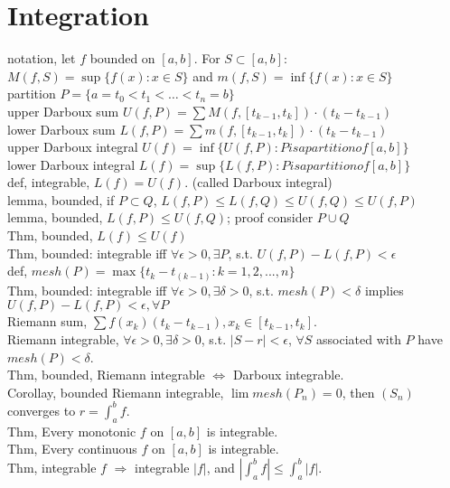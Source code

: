\documentclass[paper=a4, fontsize=11pt]{scrartcl} %
\numberwithin{equation}{section} %
\numberwithin{figure}{section} %
\numberwithin{table}{section} %
\begin{document}
\section{Integration}
notation, let $f$ bounded on $[a,b]$. For $S\subset [a,b]$:\\
$M(f,S)=\sup\{f(x):x\in S\}$ and $m(f,S) = \inf\{f(x):x\in S\}$\\
partition $P = \{a=t_0<t_1<\dots<t_n =b\}$\\
upper Darboux sum $U(f,P) = \sum M(f, [t_{k-1},t_k])\cdot (t_k-t_{k-1})$\\
lower Darboux sum $L(f,P) = \sum m(f, [t_{k-1},t_k])\cdot (t_k-t_{k-1})$\\
upper Darboux integral $U(f) = \inf \{U(f,P): P is a partition of [a,b]\}$\\
lower Darboux integral $L(f) = \sup \{L(f,P): P is a partition of [a,b]\}$\\
def, integrable, $L(f)=U(f)$. (called Darboux integral)\\
lemma, bounded, if $P\subset Q$, $L(f,P)\leq L(f,Q)\leq U(f,Q)\leq U(f,P)$\\
lemma, bounded, $L(f,P)\leq U(f,Q)$; proof consider $P\cup Q$\\
Thm, bounded, $L(f)\leq U(f)$\\
Thm, bounded: integrable iff $\forall\epsilon>0, \exists P$, s.t. $U(f,P) - L(f,P)<\epsilon$\\
def, $mesh(P) = \max\{t_k - t_(k-1) : k=1,2,...,n\}$\\
Thm, bounded: integrable iff $\forall\epsilon>0, \exists \delta>0$, s.t. $mesh(P)<\delta$ implies $U(f,P) - L(f,P)<\epsilon, \forall P$\\
Riemann sum, $\sum f(x_k)(t_k - t_{k-1}), x_k\in[t_{k-1}, t_k]$.\\
Riemann integrable, $\forall \epsilon>0, \exists \delta>0$, s.t. $|S-r|<\epsilon$, $\forall S$ associated with $P$ have $mesh(P)<\delta$.\\
Thm, bounded, Riemann integrable $\Leftrightarrow$ Darboux integrable.\\
Corollay, bounded Riemann integrable, $\lim mesh(P_n)=0$, then $(S_n)$ converges to $r=\int_a^b f$.\\
Thm, Every monotonic $f$ on $[a,b]$ is integrable.\\
Thm, Every continuous $f$ on $[a,b]$ is integrable.\\
Thm, integrable $f$ $\Rightarrow$ integrable $|f|$, and $|\int_a^b f| \leq \int_a^b|f|$.
\end{document}
